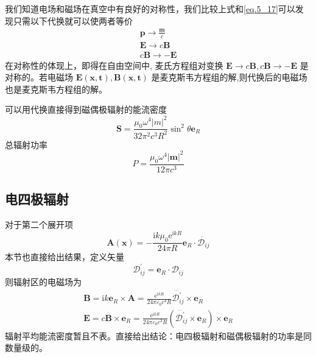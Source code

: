         我们知道电场和磁场在真空中有良好的对称性，我们比较上式和\ref{eq.5_17}可以发现只需以下代换就可以使两者等价
        \begin{equation}
            \begin{gathered}
                \boldsymbol{p} \to \frac{\boldsymbol{m}}{c} \\
                \boldsymbol{E} \to c \boldsymbol{B} \\
                c \boldsymbol{B} \to - \boldsymbol{E}
            \end{gathered}
        \end{equation}
        在对称性的体现上，即得在自由空间中, 麦氏方程组对变换 $\boldsymbol{E} \rightarrow c \boldsymbol{B}, c \boldsymbol{B} \rightarrow-\boldsymbol{E}$ 是对称的。若电磁场 $\boldsymbol{E}(\boldsymbol{x}, \boldsymbol{t}), \boldsymbol{B}(\boldsymbol{x}, \boldsymbol{t})$ 是麦克斯韦方程组的解,则代换后的电磁场也是麦克斯韦方程组的解。

        可以用代换直接得到磁偶极辐射的能流密度
        \begin{equation}
            \boldsymbol{S}=\frac{\mu_{0} \omega^{4}|m|^{2}}{32 \pi^{2} c^{3} R^{2}} \sin ^{2} \theta \boldsymbol{e}_{R}
        \end{equation}
        总辐射功率
        \begin{equation}
            P =\frac{\mu_0 \omega^4 |\boldsymbol{m}|^2}{12 \pi c^3}
        \end{equation}
    \subsection{电四极辐射}
        对于第二个展开项
        \begin{equation}
            \boldsymbol{A}(\boldsymbol{x})=-\frac{\mathrm{i} k \mu_{0} \mathrm{e}^{\mathrm{i} k R}}{24 \pi R}\boldsymbol{e}_{R} \cdot \dot{\mathscr{D}_{ij}}
        \end{equation}
        本节也直接给出结果，定义矢量\[\mathscr{D}_{ij}^\prime = \boldsymbol{e}_R \cdot \mathscr{D}_{ij}\]则辐射区的电磁场为
        \begin{equation}
            \begin{gathered}
                \boldsymbol{B}=\mathrm{i} k \boldsymbol{e}_{R} \times \boldsymbol{A}=\frac{\mathrm{e}^{\mathrm{i} k R}}{24 \pi \varepsilon_{0} c^{4} R} \dddot{\mathscr{D}_{ij}^\prime} \times \boldsymbol{e}_{R} \\
                \boldsymbol{E}=c \boldsymbol{B} \times \boldsymbol{e}_{R}=\frac{\mathrm{e}^{\mathrm{i} k R}}{24 \pi \varepsilon_{0} c^{3} R}\left(\dddot{\mathscr{D}_{ij}^\prime} \times \boldsymbol{e}_{R}\right) \times \boldsymbol{e}_{R}
            \end{gathered}
        \end{equation}
        辐射平均能流密度暂且不表。直接给出结论：电四极辐射和磁偶极辐射的功率是同数量级的。
